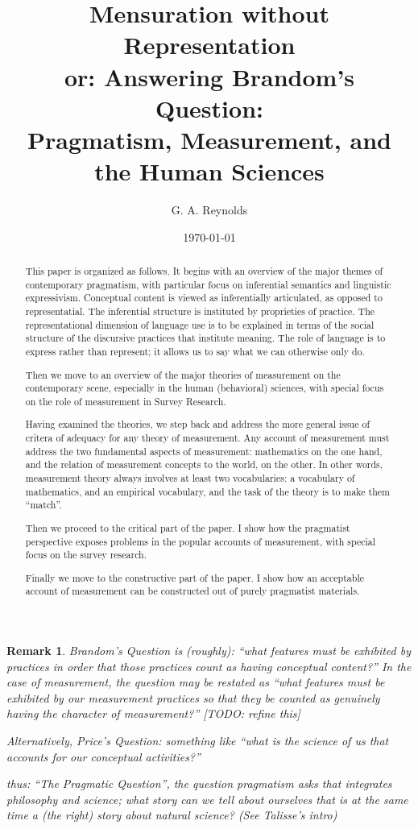 \documentclass[11pt,twoside]{article}
\title{Mensuration without Representation \\
or: Answering Brandom's Question: \\
Pragmatism, Measurement, and the Human Sciences}
\author{G. A. Reynolds}
\date{\today}
\newtheorem{remark}{Remark}
\newcommand{\SR}{Survey Research}
\begin{document}
\maketitle
\nocite{*}

\begin{abstract}
  This paper is organized as follows.  It begins with an overview of
  the major themes of contemporary pragmatism, with particular focus
  on inferential semantics and linguistic expressivism.  Conceptual
  content is viewed as inferentially articulated, as opposed to
  representatial.  The inferential structure is instituted by
  proprieties of practice.  The representational dimension of language
  use is to be explained in terms of the social structure of the
  discursive practices that institute meaning.  The role of language
  is to express rather than represent; it allows us to say what we can
  otherwise only do.

  Then we move to an overview of the major theories of measurement on
  the contemporary scene, especially in the human (behavioral)
  sciences, with special focus on the role of measurement in \SR{}.

  Having examined the theories, we step back and address the more
  general issue of critera of adequacy for any theory of measurement.
  Any account of measurement must address the two fundamental aspects
  of measurement: mathematics on the one hand, and the relation of
  measurement concepts to the world, on the other.  In other words,
  measurement theory always involves at least two vocabularies: a
  vocabulary of mathematics, and an empirical vocabulary, and the task
  of the theory is to make them ``match''.

  Then we proceed to the critical part of the paper.  I show how the
  pragmatist perspective exposes problems in the popular accounts of
  measurement, with special focus on the survey research.

  Finally we move to the constructive part of the paper.  I show how
  an acceptable account of measurement can be constructed out of
  purely pragmatist materials.
\end{abstract}


\begin{remark}
Brandom's Question is (roughly): ``what features must be exhibited by
practices in order that those practices count as having conceptual
content?''  In the case of measurement, the question may be restated
as ``what features must be exhibited by our measurement practices so
that they be counted as genuinely having the character of
measurement?'' [TODO: refine this]

Alternatively, Price's Question: something like ``what is the science
of us that accounts for our conceptual activities?''

thus: ``The Pragmatic Question'', the question pragmatism asks that
integrates philosophy and science; what story can we tell about
ourselves that is at the same time a (the right) story about natural
science?  (See Talisse's intro)
\end{remark}
\end{document}
